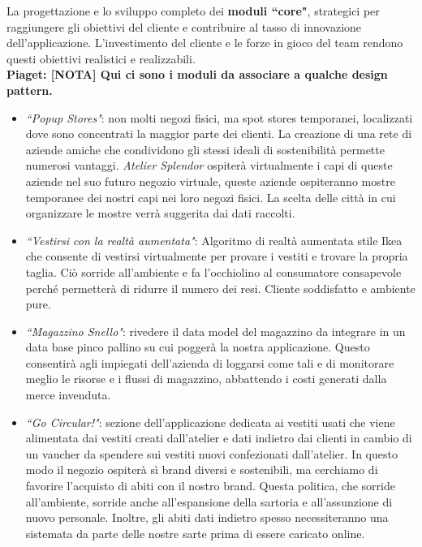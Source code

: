 \documentclass[12pt]{article}
\newcommand{\piaget}[1]{{\bf \color{dkgreen} Piaget: #1 }}
\begin{document}
La progettazione e lo sviluppo completo dei \textbf{moduli ``core"}, strategici per raggiungere gli obiettivi del cliente e contribuire al tasso di innovazione dell'applicazione. L'investimento del cliente e le forze in gioco del team rendono questi obiettivi realistici e realizzabili.
\\
\piaget{\textbf{[NOTA]} Qui ci sono i moduli da associare a qualche design pattern.}
\begin{itemize}
    \item {\em ``Popup Stores"}: non molti negozi fisici, ma spot stores temporanei, localizzati dove sono concentrati la maggior parte dei clienti. La creazione di una rete di aziende amiche che condividono gli stessi ideali di sostenibilità permette numerosi vantaggi. {\em Atelier Splendor} ospiterà virtualmente i capi di queste aziende nel suo futuro negozio virtuale, queste aziende ospiteranno mostre temporanee dei nostri capi nei loro negozi fisici. La scelta delle città in cui organizzare le mostre verrà suggerita dai dati raccolti.
    \item {\em ``Vestirsi con la realtà aumentata"}: Algoritmo di realtà aumentata stile Ikea che consente di vestirsi virtualmente per provare i vestiti e trovare la propria taglia. Ciò sorride all'ambiente e fa l'occhiolino al consumatore consapevole perché permetterà di ridurre il numero dei resi. Cliente soddisfatto e ambiente pure. 
    \item {\em ``Magazzino Snello"}: rivedere il data model del magazzino da integrare in un data base pinco pallino su cui poggerà la nostra applicazione. Questo consentirà agli impiegati dell'azienda di loggarsi come tali e di monitorare meglio le risorse e i flussi di magazzino, abbattendo i costi generati dalla merce invenduta.
    \item {\em ``Go Circular!"}: sezione dell'applicazione dedicata ai vestiti usati che viene alimentata dai vestiti creati dall'atelier e dati indietro dai clienti in cambio di un vaucher da spendere sui vestiti nuovi confezionati dall'atelier. In questo modo il negozio ospiterà sì brand diversi e sostenibili, ma cerchiamo di favorire l'acquisto di abiti con il nostro brand. Questa politica, che sorride all'ambiente, sorride anche all'espansione della sartoria e all'assunzione di nuovo personale. Inoltre, gli abiti dati indietro spesso necessiteranno una sistemata da parte delle nostre sarte prima di essere caricato online.
    
\end{itemize}
\end{document}
